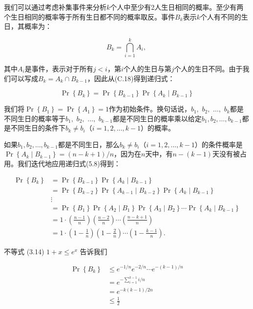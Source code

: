 \documentclass[lang=cn,newtx,10pt,scheme=chinese]{elegantbook}
\begin{document}
我们可以通过考虑补集事件来分析$k$个人中至少有2人生日相同的概率。至少有两个生日相同的概率等于所有生日都不同的概率取反。事件$B_k$表示$k$个人有不同的生日，其概率为：

$$
B_k=\bigcap_{i=1}^k A_i \text {, }
$$

其中$A_i$是事件，表示对于所有$j<i$，第$i$个人的生日与第$j$个人的生日不同。由于我们可以写成$B_k=A_k\cap B_{k-1}$，因此从(C.18)得到递归式：

$$
\operatorname{Pr}\left\{B_k\right\}=\operatorname{Pr}\left\{B_{k-1}\right\} \operatorname{Pr}\left\{A_k \mid B_{k-1}\right\}
$$

我们将$\operatorname{Pr}\left\{B_1\right\}=\operatorname{Pr}\left\{A_1\right\}=1$作为初始条件。换句话说，$b_1,$ $b_2,$ $\ldots,$ $b_k$都是不同生日的概率等于$b_1,$ $b_2,$ $\ldots,$ $b_{k-1}$都是不同生日的概率乘以给定$b_1, b_2, \ldots, b_{k-1}$都是不同生日的条件下$b_k \neq b_i$（$i=1,2,\ldots,k-1$）的概率。

如果$b_1, b_2, \ldots, b_{k-1}$都是不同生日，那么$b_k \neq b_i$（$i=1,2,\ldots,k-1$）的条件概率是$\operatorname{Pr}\left\{A_k \mid B_{k-1}\right\}=(n-k+1)/n$，因为在$n$天中，有$n-(k-1)$天没有被占用。我们迭代地应用递归式(5.8)得到：

$$
\begin{aligned}
\operatorname{Pr}\left\{B_k\right\} & =\operatorname{Pr}\left\{B_{k-1}\right\} \operatorname{Pr}\left\{A_k \mid B_{k-1}\right\} \\
& =\operatorname{Pr}\left\{B_{k-2}\right\} \operatorname{Pr}\left\{A_{k-1} \mid B_{k-2}\right\} \operatorname{Pr}\left\{A_k \mid B_{k-1}\right\} \\
& \vdots \\
& =\operatorname{Pr}\left\{B_1\right\} \operatorname{Pr}\left\{A_2 \mid B_1\right\} \operatorname{Pr}\left\{A_3 \mid B_2\right\} \cdots \operatorname{Pr}\left\{A_k \mid B_{k-1}\right\} \\
& =1 \cdot\left(\frac{n-1}{n}\right)\left(\frac{n-2}{n}\right) \cdots\left(\frac{n-k+1}{n}\right) \\
& =1 \cdot\left(1-\frac{1}{n}\right)\left(1-\frac{2}{n}\right) \cdots\left(1-\frac{k-1}{n}\right) .
\end{aligned}
$$

不等式 (3.14) $1+x \leq e^x$ 告诉我们

$$
\begin{aligned}
\operatorname{Pr}\left\{B_k\right\} & \leq e^{-1 / n} e^{-2 / n} \cdots e^{-(k-1) / n} \\
& =e^{-\sum_{i=1}^{k-1} i / n} \\
& =e^{-k(k-1) / 2 n} \\
& \leq \frac{1}{2}
\end{aligned}
$$
\end{document}
